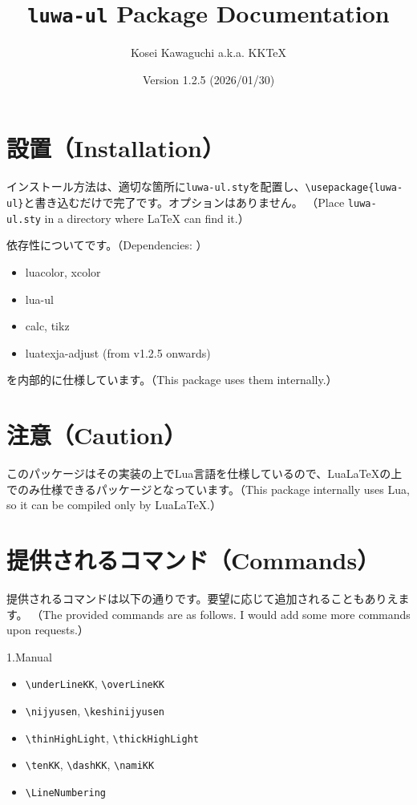 \documentclass[luatex,fontsize=8pt,paper=b5,twoside]{jlreq}%
\title{\texttt{luwa-ul} Package Documentation}
\author{Kosei Kawaguchi a.k.a. KKTeX}
\date{Version 1.2.5 (2026/01/30)}
\begin{document}
\begin{titlepage}
  \maketitle
\end{titlepage}
\newpage
\tableofcontents
\newpage

\section{設置（Installation）}
インストール方法は、適切な箇所に\texttt{luwa-ul.sty}を配置し、\verb|\usepackage{luwa-ul}|と書き込むだけで完了です。オプションはありません。
（Place \texttt{luwa-ul.sty} in a directory where LaTeX can find it.）

依存性についてです。（Dependencies: ）

\begin{itemize}
  \item luacolor, xcolor
  \item lua-ul
  \item calc, tikz
  \item luatexja-adjust (from v1.2.5 onwards)
\end{itemize}

\noindent を内部的に仕様しています。（This package uses them internally.）

\section{注意（Caution）}
このパッケージはその実装の上でLua言語を仕様しているので、LuaLaTeXの上でのみ仕様できるパッケージとなっています。（This package internally uses Lua, so it can be compiled only by LuaLaTeX.）

\section{提供されるコマンド（Commands）}
提供されるコマンドは以下の通りです。要望に応じて追加されることもありえます。
（The provided commands are as follows. I would add some more commands upon requests.）

\noindent 1.Manual
\begin{itemize}
  \item \verb|\underLineKK|, \verb|\overLineKK|
  \item \verb|\nijyusen|, \verb|\keshinijyusen|
  \item \verb|\thinHighLight|, \verb|\thickHighLight|
  \item \verb|\tenKK|, \verb|\dashKK|, \verb|\namiKK|
  \item \verb|\LineNumbering|
\end{itemize}
\end{document}

